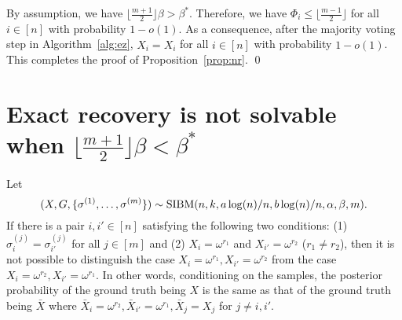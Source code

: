 \documentclass{article}
\begin{document}
By assumption, we have $\lfloor \frac{m+1}{2} \rfloor \beta>\beta^\ast$.
Therefore, we have $\Phi_i\le \lfloor \frac{m-1}{2} \rfloor$ for all $i\in[n]$ with probability $1-o(1)$.
As a consequence, after the majority voting step in Algorithm~\ref{alg:ez}, $\hat{X}_i=X_i$ for all $i\in[n]$ with probability $1-o(1)$. This completes the proof of Proposition~\ref{prop:nr}.
\hfill\qed
\section{Exact recovery is not solvable when $\lfloor \frac{m+1}{2} \rfloor \beta < \beta^\ast$}\label{sect:converse}

\begin{lemma} \label{lm:qq}
	Let 
	$$
	(X,G,\{\sigma^{(1)},\dots,\sigma^{(m)}\})\sim \operatorname{SIBM}(n,k,a\log(n)/n, b\log(n)/n,\alpha,\beta, m) .
	$$
	If there is a pair $i, i'\in[n]$ satisfying the following two conditions: (1) $\sigma_{i}^{(j)}=\sigma_{i'}^{(j)}$ for all $j\in[m]$ and (2) $X_i = \omega^{r_1}$ and $X_{i'} = \omega^{r_2}$ ($r_1 \neq r_2$), then it is not possible to distinguish
	the case $X_i = \omega^{r_1}, X_{i'} = \omega^{r_2}$
	from the case $X_i = \omega^{r_2}, X_{i'} = \omega^{r_1}$.
	In other words, conditioning on the samples, the posterior probability of the ground truth being $X$ is the same as that of the ground truth being $\bar{X}$ where $\bar{X}_{i} = \omega^{r_2}, \bar{X}_{i'} = \omega^{r_1}, \bar{X}_j = X_j$ for $j\neq i,i'$.
\end{lemma}
\end{document}
